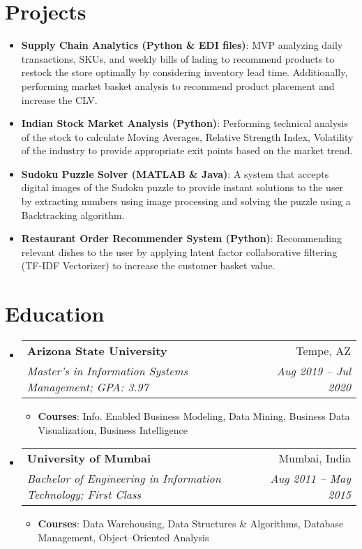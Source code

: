 \documentclass[letterpaper,10pt]{article}
\makeatletter
\newcommand{\resumeItem}[2]{
  \item\small{
    \textbf{#1}{: #2 \vspace{-2pt}}
  }
}
\newcommand{\resumeSubheading}[4]{
  \vspace{2pt}\item
    \begin{tabular*}{0.97\textwidth}{l@{\extracolsep{\fill}}r}
      \textbf{#1} & #2 \\
      \textit{\small#3} & \textit{\small #4} \\
    \end{tabular*}\vspace{-5pt}
}
\newcommand{\resumeSubItem}[2]{\resumeItem{#1}{#2}\vspace{-2pt}}
\newcommand{\resumeSubHeadingListStart}{\begin{itemize}[leftmargin=*]}
\newcommand{\resumeSubHeadingListEnd}{\end{itemize}}
\newcommand{\resumeItemListStart}{\begin{itemize}}
\newcommand{\resumeItemListEnd}{\end{itemize}\vspace{-5pt}}
\def\faGraduationCap{\unichar{"F19D}}
\def\faFlask{\unichar{"F0C3}}
\makeatother
\begin{document}
\section{{\faFlask} Projects}
\vspace{4pt}
  \resumeSubHeadingListStart
    \resumeSubItem{Supply Chain Analytics (Python \& EDI files)}
    {MVP analyzing daily transactions, SKUs, and weekly bills of lading to recommend products to restock the store optimally by considering inventory lead time. Additionally, performing market basket analysis to recommend product placement and increase the CLV.}
   \resumeSubItem{Indian Stock Market Analysis (Python)}
    {Performing technical analysis of the stock to calculate Moving Averages, Relative Strength Index, Volatility of the industry to provide appropriate exit points based on the market trend.}
  \resumeSubItem{Sudoku Puzzle Solver (MATLAB \& Java)} {A system that accepts digital images of the Sudoku puzzle to provide instant solutions to the user by extracting numbers using image processing and solving the puzzle using a Backtracking algorithm.}
    \resumeSubItem{Restaurant Order Recommender System (Python)}
     {Recommending relevant dishes to the user by applying latent factor collaborative filtering (TF-IDF Vectorizer) to increase the customer basket value.}

 
  \resumeSubHeadingListEnd



\section {{\faGraduationCap} Education}
  \resumeSubHeadingListStart
  \resumeSubheading
      {Arizona State University}{Tempe, AZ}
      {Master's in Information Systems Management; GPA: 3.97}{Aug 2019 -- Jul 2020}
      \resumeItemListStart
       \resumeItem{Courses}
       {Info. Enabled Business Modeling, Data Mining, Business Data Visualization, Business Intelligence}
       \resumeItemListEnd
    \resumeSubheading
      {University of Mumbai}{Mumbai, India}
      {Bachelor of Engineering in Information Technology;  First Class}{Aug 2011 -- May 2015}
      \resumeItemListStart
      \resumeItem{Courses}
       {Data Warehousing, Data Structures \& Algorithms, Database Management, Object--Oriented Analysis}
       \resumeItemListEnd
  \resumeSubHeadingListEnd


\end{document}
